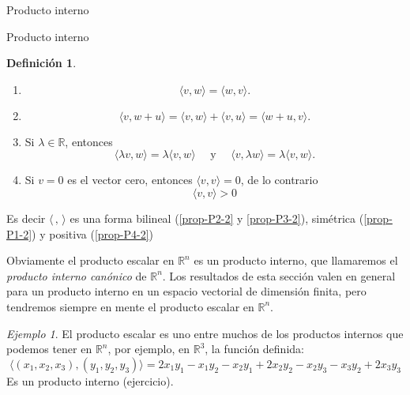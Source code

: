 \documentclass[a4paper,12pt,twoside,spanish,reqno]{amsbook}
\numberwithin{equation}{section}
\theoremstyle{definition}
\newtheorem{definicion}[teorema]{Definici\'on}
\theoremstyle{remark}
\newtheorem*{ejemplo*}{Ejemplo}
\newcommand{\la}{\langle}
\newcommand{\ra}{\rangle}
\newcommand{\R}{\mathbb R}
\begin{document}
\begin{chapter}{Producto interno}
\begin{section}{Producto interno}
\begin{definicion}
            \begin{enumerate}[label=\textbf{P\arabic*.},ref=P\arabic*]
                \item\label{prop-P1-2}
                \begin{equation*}
                    \langle v , w \rangle = \langle w , v \rangle.
                \end{equation*} 	
                \item\label{prop-P2-2} 
                \begin{equation*}
                \langle v , w + u \rangle =\langle v , w \rangle + \langle v , u \rangle = \langle w +u , v \rangle.
                \end{equation*}
                \item\label{prop-P3-2}  Si $\lambda \in \R$, entonces 
                \begin{equation*}
                \langle \lambda v , w \rangle = \lambda \langle v , w \rangle \quad \text{ y } \quad  \langle v , \lambda w \rangle = \lambda \langle v , w \rangle.
                \end{equation*}
                \item\label{prop-P4-2} Si $v=0$ es el vector cero, entonces $\langle v , v \rangle =0$,  de lo contrario
                \begin{equation*}
                \langle v , v \rangle >0
                \end{equation*}
            \end{enumerate}
            Es decir  $\la \,,\,\ra$ es una forma bilineal (\ref{prop-P2-2} y \ref{prop-P3-2}),  simétrica (\ref{prop-P1-2}) y positiva (\ref{prop-P4-2})
        \end{definicion}
    
        
        Obviamente el producto escalar en $\R^n$  es un producto interno,  que llamaremos  el  \textit{producto interno canónico} de $\R^n$. Los resultados de esta sección valen en general para un producto interno en un espacio vectorial de dimensión finita, pero tendremos siempre en mente el producto escalar en $\R^n$. 

            \begin{ejemplo*} El producto escalar es uno entre  muchos de los productos internos que podemos tener en $\R^n$, por ejemplo,  en $\R^3$,  la función definida:
                \begin{equation*}
                    \langle (x_1,x_2,x_3) , (y_1,y_2,y_3)\rangle =2x_1y_1-x_1y_2-x_2y_1+2x_2y_2-x_2y_3-x_3y_2+2x_3y_3
                \end{equation*}
                Es un producto interno (ejercicio).
            \end{ejemplo*}
        

\end{section}
\end{chapter}
\end{document}
